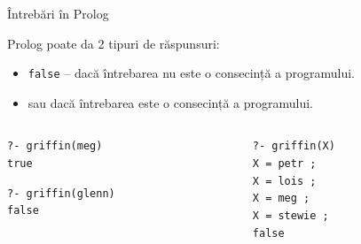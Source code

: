\documentclass[xcolor=pdftex,romanian,colorlinks]{beamer}
\begin{document}

\begin{frame}{\^Intrebări în Prolog}


Prolog poate da 2 tipuri de răspunsuri:
	\begin{itemize}
		\item {\color{red} \texttt{false}} -- dacă întrebarea nu este o consecință a programului.
		\smallskip
		\item {} sau  dacă întrebarea este o consecință a programului.
	\end{itemize}

 
\begin{example}
\smallskip
\begin{columns}
\begin{column}{.4\textwidth}
 \texttt{?- griffin(meg)} \\
	  \texttt{true}
	  
\texttt{?- griffin(glenn)} \\
	  \texttt{false}
\vspace{.8cm}	
\end{column}
\begin{column}{.4\textwidth}
\texttt{?- griffin(X)} \\
	\texttt{X = petr ;} \\
	\texttt{X = lois ;} \\
	\texttt{X = meg ;} \\
	\texttt{X = stewie ;} \\
	\texttt{false} \\
\end{column}
\end{columns}
\smallskip
\end{example}
\end{frame}



\end{document}
